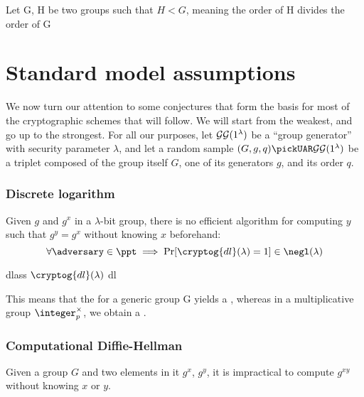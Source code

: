 \begin{theorem}
    Let G, H be two groups such that $H < G$, meaning the order of H divides the order of G
\end{theorem}

\section{Standard model assumptions}

We now turn our attention to some conjectures that form the basis for most of the cryptographic schemes that will follow. We will start from the weakest, and go up to the strongest. For all our purposes, let $\mathcal{GG}(1^\lambda)$ be a ``group generator'' with security parameter $\lambda$, and let a random sample $(G, g, q) \pickUAR \groupgen(1^\lambda)$ be a triplet composed of the group itself $G$, one of its generators $g$, and its order $q$.

\subsubsection{Discrete logarithm}

Given $g$ and $g^x$ in a $\lambda$-bit group, there is no efficient algorithm for computing $y$ such that $g^y = g^x$ without knowing $x$ beforehand:
\[
    \forall \adversary \in \ppt \implies \Pr[\cryptog{dl}(\lambda) = 1] \in \negl(\lambda)
\]

\begin{cryptogame}
    {dlass}
    {$\cryptog{dl}(\lambda)$}
    {dl}


    
\end{cryptogame}

This means that the \dl{} for a generic group G yields a \owf, whereas in a multiplicative group $\integer_p^\times$, we obtain a \owp.

\subsubsection{Computational Diffie-Hellman}

Given a group $G$ and two elements in it $g^x$, $g^y$, it is impractical to compute $g^{xy}$ without knowing $x$ or $y$.

